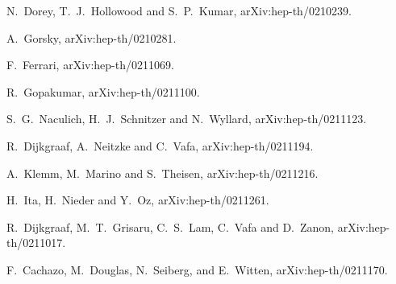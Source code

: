 \documentclass[a4paper,12pt]{article}
\begin{document}
\begin{thebibliography}{99}
N.~Dorey, T.~J.~Hollowood and S.~P.~Kumar,
arXiv:hep-th/0210239.

A.~Gorsky,
arXiv:hep-th/0210281.





F.~Ferrari,
arXiv:hep-th/0211069.




R.~Gopakumar,
arXiv:hep-th/0211100.

S.~G.~Naculich, H.~J.~Schnitzer and N.~Wyllard,
arXiv:hep-th/0211123.



R.~Dijkgraaf, A.~Neitzke and C.~Vafa,
arXiv:hep-th/0211194.

A.~Klemm, M.~Marino and S.~Theisen,
arXiv:hep-th/0211216.

H.~Ita, H.~Nieder and Y.~Oz,
arXiv:hep-th/0211261.



R.~Dijkgraaf, M.~T.~Grisaru, C.~S.~Lam, C.~Vafa and D.~Zanon,
arXiv:hep-th/0211017.

F.~Cachazo, M.~Douglas, N.~Seiberg, and E.~Witten,
arXiv:hep-th/0211170.




\end{thebibliography}
\end{document}
